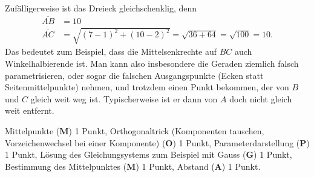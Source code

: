 \begin{diskussion}
Zufälligerweise ist das Dreieck gleichschenklig, denn
\begin{align*}
\overline{AB}
&=
10
\\
\overline{AC}
&=
\sqrt{(7-1)^2 + (10-2)^2}=\sqrt{36 + 64}=\sqrt{100}=10.
\end{align*}
Das bedeutet zum Beispiel, dass die Mittelsenkrechte auf $BC$ auch
Winkelhalbierende ist.
Man kann also insbesondere die Geraden ziemlich falsch parametrisieren,
oder sogar die falschen Ausgangspunkte (Ecken statt Seitenmittelpunkte)
nehmen, und trotzdem einen Punkt bekommen, der von $B$ und $C$ gleich
weit weg ist. Typischerweise ist er dann von $A$ doch nicht gleich weit
entfernt.
\end{diskussion}

\begin{bewertung}
Mittelpunkte ({\bf M}) 1 Punkt, Orthogonaltrick (Komponenten tauschen, 
Vorzeichenwechsel bei einer Komponente) ({\bf O}) 1 Punkt,
Parameterdarstellung ({\bf P}) 1 Punkt, Lösung des Gleichungsystems
zum Beispiel mit Gauss ({\bf G}) 1 Punkt, Bestimmung des Mittelpunktes
({\bf M}) 1 Punkt, Abstand ({\bf A}) 1 Punkt.
\end{bewertung}

